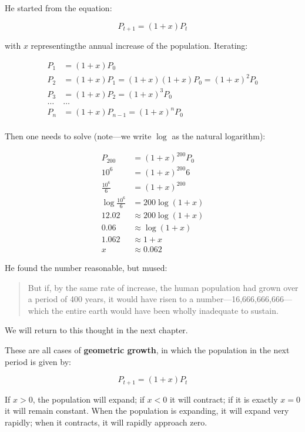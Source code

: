 \documentclass[
  letterpaper,
]{scrbook}
\begin{document}
He started from the equation:

\[
P_{t+1} = (1 + x) P_t
\]

with \(x\) representingthe annual increase of the population. Iterating:

\[
\begin{aligned}
P_1 &= (1 + x) P_0\\
P_2 &= (1 + x) P_1 = (1 + x) (1+x) P_0 = (1+x)^2 P_0\\
P_3 &= (1 + x) P_2 = (1+x)^3 P_0\\
\ldots & \ldots\\
P_n &= (1 + x) P_{n-1} = (1+x)^n P_0\\
\end{aligned}
\]

Then one needs to solve (note---we write \(\log\) as the natural
logarithm):

\[
\begin{aligned}
P_{200} &= (1+x)^{200}P_0\\
10^6 &= (1 + x)^{200} 6\\
\frac{10^6}{6} &= (1+x)^{200}\\
\log \frac{10^6}{6} &= 200 \log(1+x)\\
12.02 &\approx 200 \log(1+x)\\
0.06 &\approx \log(1+x)\\
1.062 &\approx 1+x\\
x &\approx 0.062
\end{aligned}
\]

He found the number reasonable, but mused:

\begin{quote}
But if, by the same rate of increase, the human population had grown
over a period of 400 years, it would have risen to a
number---16,666,666,666---which the entire earth would have been wholly
inadequate to sustain.
\end{quote}

We will return to this thought in the next chapter.

\begin{tcolorbox}[enhanced jigsaw, opacitybacktitle=0.6, toptitle=1mm, bottomrule=.15mm, left=2mm, leftrule=.75mm, title=\textcolor{quarto-callout-tip-color}{\faLightbulb}\hspace{0.5em}{Geometric growth}, colbacktitle=quarto-callout-tip-color!10!white, colframe=quarto-callout-tip-color-frame, coltitle=black, breakable, bottomtitle=1mm, toprule=.15mm, opacityback=0, arc=.35mm, rightrule=.15mm, colback=white, titlerule=0mm]

These are all cases of \textbf{geometric growth}, in which the
population in the next period is given by:

\[
P_{t+1} = (1+x)P_t
\]

If \(x > 0\), the population will expand; if \(x<0\) it will contract;
if it is exactly \(x=0\) it will remain constant. When the population is
expanding, it will expand very rapidly; when it contracts, it will
rapidly approach zero.

\end{tcolorbox}
\end{document}
